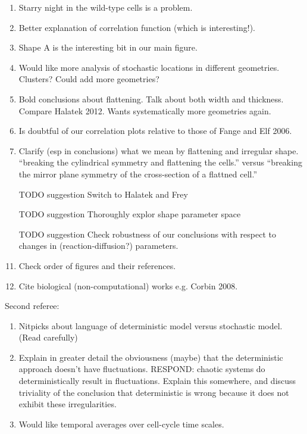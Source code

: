 \documentclass[10pt,letterpaper]{article}
\begin{document}
{\begin{enumerate}
    \emph{If you can't make it grow in a .3 micron (rigid) silicon channel,
      then we and you observe it growing in a .25 micron flexible
      channel, it presumably must be able to grow because it deformed
      the channel to larger than .3 microns.}
  \item Starry night in the wild-type cells is a problem.
  \item Better explanation of correlation function (which is
    interesting!).
  \item Shape A is the interesting bit in our main figure.
  \item Would like more analysis of stochastic locations in different
    geometries.  Clusters?  Could add more geometries?
  \item Bold conclusions about flattening.  Talk about both width and
    thickness.  Compare Halatek 2012.  Wants systematically more
    geometries again.
  \item Is doubtful of our correlation plots relative to those of
    Fange and Elf 2006.
  \item Clarify (esp in conclusions) what we mean by flattening and
    irregular shape.  ``breaking the cylindrical symmetry and
    flattening the cells.'' versus ``breaking the mirror plane
    symmetry of the cross-section of a flattned cell.''
  \item[TODO suggestion] Switch to Halatek and Frey
  \item[TODO suggestion] Thoroughly explor shape parameter space
  \item[TODO suggestion] Check robustness of our conclusions with
    respect to changes in (reaction-diffusion?) parameters.
  \item Check order of figures and their references.
  \item Cite biological (non-computational) works e.g. Corbin 2008.
  \end{enumerate}
  Second referee:
  \begin{enumerate}
  \item Nitpicks about language of deterministic model versus
    stochastic model.  (Read carefully)
  \item Explain in greater detail the obviousness (maybe) that the
    deterministic approach doesn't have fluctuations.  RESPOND:
    chaotic systems do deterministically result in fluctuations.
    Explain this somewhere, and discuss triviality of the conclusion
    that deterministic is wrong because it does not exhibit these
    irregularities.
  \item Would like temporal averages over cell-cycle time scales.

\end{enumerate}}
\end{document}

